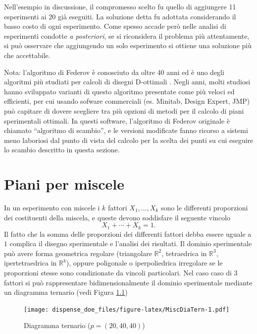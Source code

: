 \documentclass[
  11pt,
]{book}
\begin{document}
Nell'esempio in discussione, il compromesso scelto fu quello di aggiungere 11 esperimenti ai 20 già eseguiti. La soluzione detta fu adottata considerando il basso costo di ogni esperimento. Come spesso accade però nelle analisi di esperimenti condotte \emph{a posteriori}, se si riconsidera il problema più attentamente, si può osservare che aggiungendo un solo esperimento si ottiene una soluzione più che accettabile.

Nota: l'algoritmo di Federov è conosciuto da oltre 40 anni ed è uno degli algoritmi più studiati per calcoli di disegni D-ottimali \citep{v.v.federov1972}. Negli anni, molti studiosi hanno sviluppato varianti di questo algoritmo presentate come più veloci ed efficienti, per cui usando sofware commerciali (es. Minitab, Design Expert, JMP) può capitare di dovere scegliere tra più opzioni di metodi per il calcolo di piani sperimentali ottimali. In questi software, l'algoritmo di Federov originale è chiamato ``algoritmo di scambio'', e le versioni modificate fanno ricorso a sistemi meno laboriosi dal punto di vista del calcolo per la scelta dei punti su cui eseguire lo scambio descritto in questa sezione.

\hypertarget{piani-per-miscele}{%
\chapter{Piani per miscele}\label{piani-per-miscele}}

In un esperimento con miscele i \(k\) fattori \(X_1, \dots, X_k\) sono le differenti proporzioni dei costituenti della miscela, e queste devono soddisfare il seguente vincolo
\begin{equation}
    X_1+\cdots+X_k=1.
    \label{eq:VinMisc}
 \end{equation}
Il fatto che la somma delle proporzioni dei differenti fattori debba essere uguale a \(1\) complica il disegno sperimentale e l'analisi dei risultati. Il dominio sperimentale può avere forma geometrica regolare (triangolare \(\mathbb{R}^2\), tetraedrica in \(\mathbb{R}^3\), ipertetraedrica in \(\mathbb{R}^k\)), oppure poligonale o iperpoliedrica irregolare se le proporzioni stesse sono condizionate da vincoli particolari.
Nel caso caso di \(3\) fattori si può rappresentare bidimensionalmente il dominio sperimentale mediante un diagramma ternario (vedi Figura \ref{fig:MiscDiaTern})

\begin{figure}
\centering
\texttt{[image: dispense\_doe\_files/figure-latex/MiscDiaTern-1.pdf]}
\caption{\label{fig:MiscDiaTern}Diagramma ternario (\(p=(20,40,40)\))}
\end{figure}
\end{document}

